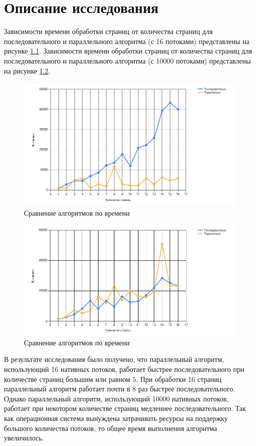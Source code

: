 \chapter{Описание исследования}

Зависимости времени обработки страниц от количества страниц для последовательного и параллельного алгоритма (с 16 потоками) представлены на рисунке \ref{fig:tm}. Зависимости времени обработки страниц от количества страниц для последовательного и параллельного алгоритма (с 10000 потоками) представлены на рисунке \ref{fig:tm2}.
\begin{figure}[h]
    \centering
    \includegraphics[width=0.7\linewidth]{img/6-research.png}
    \caption{Сравнение алгоритмов по времени}
    \label{fig:tm}
\end{figure}
\begin{figure}[h]
    \centering
    \includegraphics[width=0.7\linewidth]{img/7-research.png}
    \caption{Сравнение алгоритмов по времени}
    \label{fig:tm2}
\end{figure}

\clearpage
В результате исследования было получено, что параллельный алгоритм, использующий 16 нативных потоков, работает быстрее последовательного при количестве страниц большим или равном $5$. При обработки 16 страниц параллельный алгоритм работает почти в 8 раз быстрее последовательного. Однако параллельный алгоритм, использующий 10000 нативных потоков, работает при некотором количестве страниц медленнее последовательного. Так как операционная система вынуждена затрачивать ресурсы на поддержку большого количества потоков, то общее время выполнения алгоритма увеличилось. 


